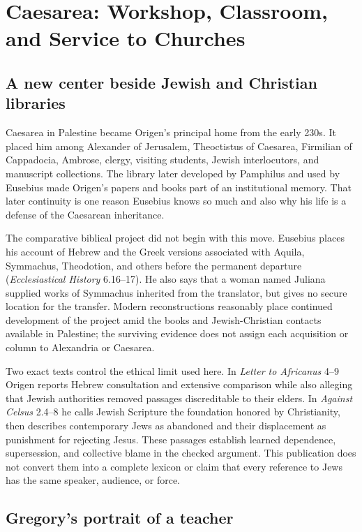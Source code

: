 \section{Caesarea: Workshop, Classroom, and Service to Churches}
\label{sec:origen-caesarea}

\subsection{A new center beside Jewish and Christian libraries}

Caesarea in Palestine became Origen's principal home from the early 230s. It
placed him among Alexander of Jerusalem, Theoctistus of Caesarea, Firmilian of
Cappadocia, Ambrose, clergy, visiting students, Jewish interlocutors, and
manuscript collections. The library later developed by Pamphilus and used by
Eusebius made Origen's papers and books part of an institutional memory. That
later continuity is one reason Eusebius knows so much and also why his life is
a defense of the Caesarean inheritance.

The comparative biblical project did not begin with this move. Eusebius places
his account of Hebrew and the Greek versions associated with Aquila,
Symmachus, Theodotion, and others before the permanent departure
(\emph{Ecclesiastical History} 6.16--17). He also says that a woman named
Juliana supplied works of Symmachus inherited from the translator, but gives no
secure location for the transfer. Modern reconstructions reasonably place
continued development of the project amid the books and Jewish-Christian
contacts available in Palestine; the surviving evidence does not assign each
acquisition or column to Alexandria or Caesarea.

Two exact texts control the ethical limit used here. In \emph{Letter to
Africanus} 4--9 Origen reports Hebrew consultation and extensive comparison
while also alleging that Jewish authorities removed passages discreditable to
their elders. In \emph{Against Celsus} 2.4--8 he calls Jewish Scripture the
foundation honored by Christianity, then describes contemporary Jews as
abandoned and their displacement as punishment for rejecting Jesus. These
passages establish learned dependence, supersession, and collective blame in
the checked argument. This publication does not convert them into a complete
lexicon or claim that every reference to Jews has the same speaker, audience,
or force.

\subsection{Gregory's portrait of a teacher}

